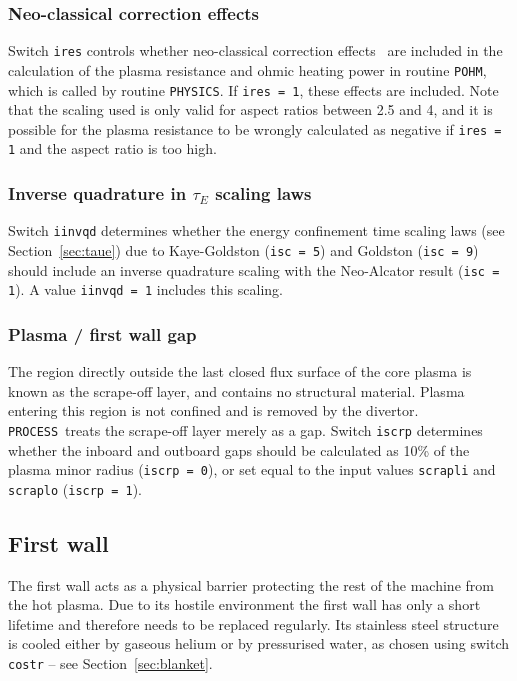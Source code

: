 \documentclass[11pt,a4paper]{report}
\newcommand{\process}{\mbox{\texttt{PROCESS}}}
\begin{document}
\subsubsection*{Neo-classical correction effects}

Switch \texttt{ires} controls whether neo-classical correction
effects~\cite{Uckan} are included in the calculation of the plasma resistance
and ohmic heating power in routine \texttt{POHM}, which is called by routine
\texttt{PHYSICS}. If \texttt{ires = 1}, these effects are included. Note that
the scaling used is only valid for aspect ratios between 2.5 and 4, and it is
possible for the plasma resistance to be wrongly calculated as negative if
\texttt{ires = 1} and the aspect ratio is too high.

\subsubsection*{Inverse quadrature in $\tau_E$ scaling laws}

Switch \texttt{iinvqd} determines whether the energy confinement time scaling
laws (see Section~\ref{sec:taue}) due to Kaye-Goldston (\texttt{isc = 5}) and
Goldston (\texttt{isc = 9}) should include an inverse quadrature scaling with
the Neo-Alcator result (\texttt{isc = 1}). A value \texttt{iinvqd = 1}
includes this scaling.

\subsubsection*{Plasma / first wall gap}

The region directly outside the last closed flux surface of the core plasma is
known as the scrape-off layer, and contains no structural material.  Plasma
entering this region is not confined and is removed by the divertor. \process\
treats the scrape-off layer merely as a gap. Switch \texttt{iscrp} determines
whether the inboard and outboard gaps should be calculated as 10\% of the
plasma minor radius (\texttt{iscrp = 0}), or set equal to the input values
\texttt{scrapli} and \texttt{scraplo} (\texttt{iscrp = 1}).

\subsection{First wall}

The first wall acts as a physical barrier protecting the rest of the machine
from the hot plasma. Due to its hostile environment the first wall has only a
short lifetime and therefore needs to be replaced regularly. Its stainless
steel structure is cooled either by gaseous helium or by pressurised water, as
chosen using switch \texttt{costr} -- see Section~\ref{sec:blanket}.
\end{document}

